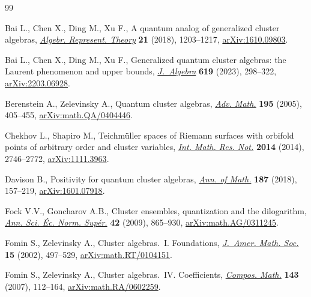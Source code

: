 \begin{thebibliography}{99}
\footnotesize\itemsep=0pt

Bai L., Chen X., Ding M., Xu F., A quantum analog of generalized cluster
  algebras, \href{https://doi.org/10.1007/s10468-017-9743-7}{\textit{Algebr. Represent. Theory}} \textbf{21} (2018), 1203--1217,
  \href{https://arxiv.org/abs/1610.09803}{arXiv:1610.09803}.

Bai L., Chen X., Ding M., Xu F., Generalized quantum cluster algebras: the
  {L}aurent phenomenon and upper bounds, \href{https://doi.org/10.1016/j.jalgebra.2022.12.012}{\textit{J.~Algebra}} \textbf{619}
  (2023), 298--322, \href{https://arxiv.org/abs/2203.06928}{arXiv:2203.06928}.

Berenstein A., Zelevinsky A., Quantum cluster algebras, \href{https://doi.org/10.1016/j.aim.2004.08.003}{\textit{Adv. Math.}}
  \textbf{195} (2005), 405--455, \href{https://arxiv.org/abs/math.QA/0404446}{arXiv:math.QA/0404446}.

Chekhov L., Shapiro M., Teichm\"uller spaces of {R}iemann surfaces with
  orbifold points of arbitrary order and cluster variables,  \href{https://doi.org/10.1093/imrn/rnt016}{\textit{Int. Math.
  Res. Not.}} \textbf{2014} (2014), 2746--2772, \href{https://arxiv.org/abs/1111.3963}{arXiv:1111.3963}.

Davison B., Positivity for quantum cluster algebras,  \href{https://doi.org/10.4007/annals.2018.187.1.3}{\textit{Ann. of Math.}}
  \textbf{187} (2018), 157--219, \href{https://arxiv.org/abs/1601.07918}{arXiv:1601.07918}.

Fock V.V., Goncharov A.B., Cluster ensembles, quantization and the dilogarithm,
   \href{https://doi.org/10.24033/asens.2112}{\textit{Ann. Sci. \'Ec. Norm. Sup\'er.}} \textbf{42} (2009), 865--930,
  \href{https://arxiv.org/abs/math.AG/0311245}{arXiv:math.AG/0311245}.

Fomin S., Zelevinsky A., Cluster algebras.~{I}. {F}oundations, \href{https://doi.org/10.1090/S0894-0347-01-00385-X}{\textit{J.~Amer.
  Math. Soc.}} \textbf{15} (2002), 497--529, \href{https://arxiv.org/abs/math.RT/0104151}{arXiv:math.RT/0104151}.

Fomin S., Zelevinsky A., Cluster algebras.~{IV}. {C}oefficients,
  \href{https://doi.org/10.1112/S0010437X06002521}{\textit{Compos. Math.}} \textbf{143} (2007), 112--164,
  \href{https://arxiv.org/abs/math.RA/0602259}{arXiv:math.RA/0602259}.


\end{thebibliography}
